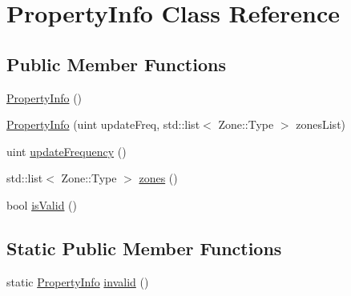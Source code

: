 \hypertarget{classPropertyInfo}{\section{Property\-Info Class Reference}
\label{classPropertyInfo}
}
\subsection*{Public Member Functions}
\begin{DoxyCompactItemize}
\item 
\hyperlink{classPropertyInfo_aec9353196a1c2bbebd516e0f548e15ad}{Property\-Info} ()
\item 
\hyperlink{classPropertyInfo_a5a82c86cafebf0eb71277b868e6dd72a}{Property\-Info} (uint update\-Freq, std\-::list$<$ Zone\-::\-Type $>$ zones\-List)
\item 
uint \hyperlink{classPropertyInfo_a8e6740dabbdea52c6b0900549c109963}{update\-Frequency} ()
\item 
std\-::list$<$ Zone\-::\-Type $>$ \hyperlink{classPropertyInfo_a75d2f92c083e37c2059b1b5247a15dd8}{zones} ()
\item 
bool \hyperlink{classPropertyInfo_a574538766c305b7303a0d5721a0fd0d1}{is\-Valid} ()
\end{DoxyCompactItemize}
\subsection*{Static Public Member Functions}
\begin{DoxyCompactItemize}
\item 
static \hyperlink{classPropertyInfo}{Property\-Info} \hyperlink{classPropertyInfo_a5a3e9a1198ac54a40b1f3ae009bb1397}{invalid} ()
\end{DoxyCompactItemize}


